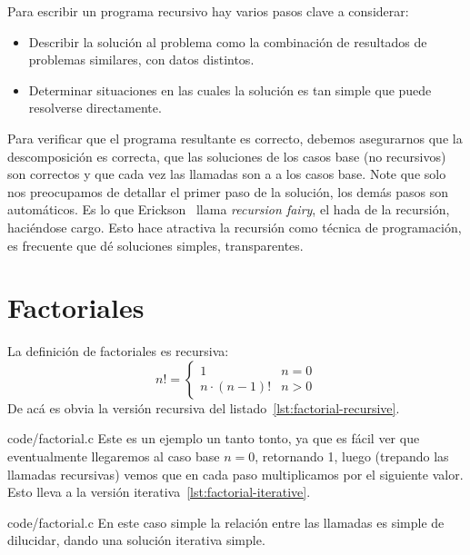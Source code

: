   Para escribir un programa recursivo hay varios pasos clave
  a considerar:
  \begin{itemize}
  \item
    Describir la solución al problema como la combinación
    de resultados de problemas similares,
    con datos distintos.
  \item
    Determinar situaciones en las cuales la solución es tan simple
    que puede resolverse directamente.
  \end{itemize}
  Para verificar que el programa resultante es correcto,
  debemos asegurarnos que la descomposición es correcta,
  que las soluciones de los casos base
  (no recursivos)
  son correctos
  y que cada vez las llamadas son a 
  a los casos base.
  Note que solo nos preocupamos de detallar el primer paso de la solución,
  los demás pasos son automáticos.
  Es lo que Erickson~%
    \cite{erickson19:_algorithms}
  llama \emph{\foreignlanguage{english}{recursion fairy}},
  el hada de la recursión,
  haciéndose cargo.
  Esto hace atractiva la recursión como técnica de programación,
  es frecuente que dé soluciones simples,
  transparentes.

\section{Factoriales}
\label{sec:factoriales}

  La definición de factoriales es recursiva:
  \begin{equation*}
    n!
      = \begin{cases}
          1		    & n = 0 \\
          n \cdot (n - 1)!  & n > 0
        \end{cases}
  \end{equation*}
  De acá es obvia la versión recursiva
  del listado~\ref{lst:factorial-recursive}.
  
                  {code/factorial.c}
  Este es un ejemplo un tanto tonto,
  ya que es fácil ver que eventualmente llegaremos al caso base \(n = 0\),
  retornando \num{1},
  luego
  (trepando las llamadas recursivas)
  vemos que en cada paso multiplicamos por el siguiente valor.
  Esto lleva a la versión iterativa~\ref{lst:factorial-iterative}.
  
                  {code/factorial.c}
  En este caso simple la relación entre las llamadas
  es simple de dilucidar,
  dando una solución iterativa simple.

